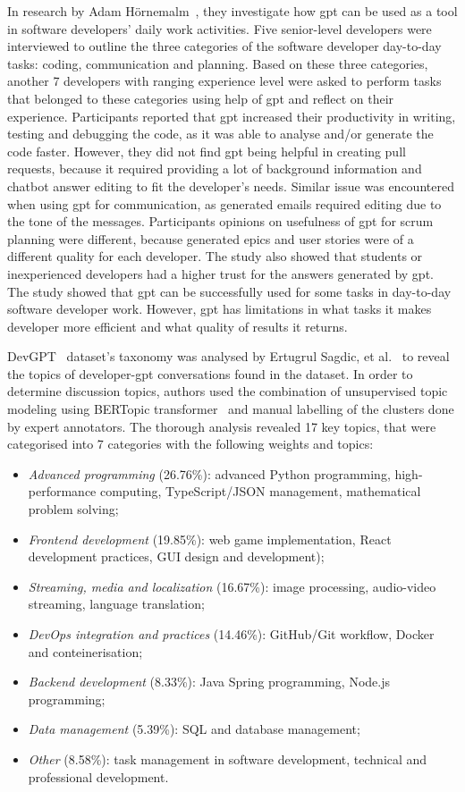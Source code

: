 In research by Adam Hörnemalm~\cite{Hörnemalm_2023}, they investigate how \gls{gpt} can be used as a tool in software developers' daily work activities. Five senior-level developers were interviewed to outline the three categories of the software developer day-to-day tasks: coding, communication and planning. Based on these three categories, another 7 developers with ranging experience level were asked to perform tasks that belonged to these categories using help of \gls{gpt} and reflect on their experience. Participants reported that \gls{gpt} increased their productivity in writing, testing and debugging the code, as it was able to analyse and/or generate the code faster. However, they did not find \gls{gpt} being helpful in creating pull requests, because it required providing a lot of background information and chatbot answer editing to fit the developer's needs. Similar issue was encountered when using \gls{gpt} for communication, as generated emails required editing due to the tone of the messages. Participants opinions on usefulness of \gls{gpt} for scrum planning were different, because generated epics and user stories were of a different quality for each developer. The study also showed that students or inexperienced developers had a higher trust for the answers generated by \gls{gpt}. The study showed that \gls{gpt} can be successfully used for some tasks in day-to-day software developer work. However, \gls{gpt} has limitations in what tasks it makes developer more efficient and what quality of results it returns. 

DevGPT~\cite{devgpt} dataset's taxonomy was analysed by Ertugrul Sagdic, et al.~\cite{devgpt-taxonomy} to reveal the topics of developer-\gls{gpt} conversations found in the dataset. In order to determine discussion topics, authors used the combination of unsupervised topic modeling using BERTopic transformer~\cite{bertopic} and manual labelling of the clusters done by expert annotators. The thorough analysis revealed 17 key topics, that were categorised into 7 categories with the following weights and topics: \begin{itemize}
    \item \textit{Advanced programming} (26.76\%): advanced Python programming, high-performance computing, TypeScript/JSON management, mathematical problem solving;
    \item \textit{Frontend development} (19.85\%): web game implementation, React development practices, GUI design and development); 
    \item \textit{Streaming, media and localization} (16.67\%): image processing, audio-video streaming, language translation;
    \item \textit{DevOps integration and practices} (14.46\%):  GitHub/Git workflow, Docker and conteinerisation;
    \item \textit{Backend development} (8.33\%): Java Spring programming, Node.js programming;
    \item \textit{Data management} (5.39\%): SQL and database management;
    \item \textit{Other} (8.58\%): task management in software development, technical and professional development.
\end{itemize}

